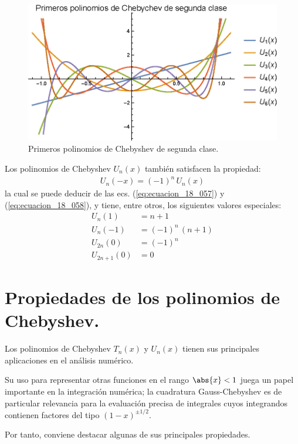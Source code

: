 \begin{figure}[H]
    \centering
    \includegraphics[scale=1.2]{Imagenes/Plot_Polinomios_Chebychev_02.eps}
    \caption{Primeros polinomios de Chebyshev de segunda clase.}
    \label{fig:figura_plot_chebychev_02}
\end{figure}
Los polinomios de Chebyshev $U_{n}(x)$ también satisfacen la propiedad:
\begin{align*}
U_{n} (-x) = (-1)^{n} \, U_{n} (x)
\end{align*}
la cual se puede deducir de las ecs. (\ref{eq:ecuacion_18_057}) y (\ref{eq:ecuacion_18_058}), y tiene, entre otros, los siguientes valores especiales:
\begin{align*}
U_{n} (1) &= n + 1 \\[0.5em]
U_{n} (-1) &= (-1)^{n} \, (n + 1) \\[0.5em]
U_{2n} (0) &= (-1)^{n} \\[0.5em]
U_{2n+1} (0) &= 0
\end{align*}

\newpage
\section{Propiedades de los polinomios de Chebyshev.}

Los polinomios de Chebyshev $T_{n} (x)$ y $U_{n} (x)$ tienen sus principales aplicaciones en el análisis numérico.
\par
Su uso para representar otras funciones en el rango $\abs{x} < 1$ juega un papel importante en la integración numérica; la cuadratura Gauss-Chebyshev es de particular relevancia para la evaluación precisa de integrales cuyos integrandos contienen factores del tipo $(1 - x)^{\pm 1/2}$.
\par
Por tanto, conviene destacar algunas de sus principales propiedades.

